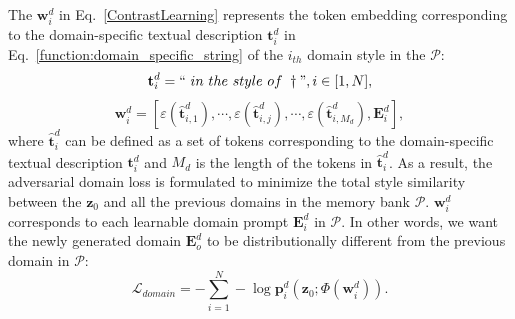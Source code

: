 The $\mathbf{w}_i^d$ in Eq.~\textcolor{red}{\ref{ContrastLearning}} represents the token embedding corresponding to the domain-specific textual description $\mathbf{t}_i^d$ in Eq.~\textcolor{red}{\ref{function:domain_specific_string}} of the $i_{th}$ domain style in the $\mathcal{P}$:
\begin{equation}
    \mathbf{t}_i^d = `` \ in \ the \ style \ of \ \dagger", i \in [1,N],
    \label{function:domain_specific_string}
\end{equation}
\begin{equation}
    \mathbf{w}_i^d=[\varepsilon(\hat{\mathbf{t}}_{i,1}^d),\cdots,\varepsilon(\hat{\mathbf{t}}_{i,j}^d),\cdots,\varepsilon(\hat{\mathbf{t}}_{i,M_d}^d), \mathbf{E}^d_i ],
    \label{function:token_generate_domain}
\end{equation}
where $\hat{\mathbf{t}}_i^d$ can be defined as a set of tokens corresponding to the domain-specific textual description $\mathbf{t}_i^d$ and $M_d$ is the length of the tokens in $\hat{\mathbf{t}}_i^d$.
As a result, the adversarial domain loss is formulated to minimize the total style similarity between the $\mathbf{z}_0$ and all the previous domains in the memory bank $\mathcal{P}$. $\mathbf{w}^d_i$ corresponds to each learnable domain prompt $\mathbf{E}_i^d$ in $\mathcal{P}$.
In other words, we want the newly generated domain $\mathbf{E}_o^d$ to be distributionally different from the previous domain in $\mathcal{P}$:
\begin{equation}
    \mathcal{L}_{domain}=-\sum_{i=1}^{N} -\log \mathbf{p}^d_i(\mathbf{z}_0; \Phi(\mathbf{w}^d_i)).
    \label{function:domain_reward}
\end{equation}

